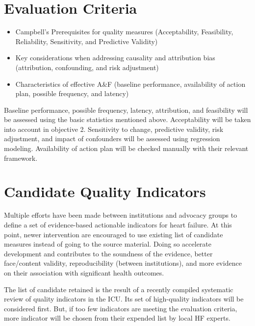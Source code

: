\section{Evaluation Criteria}
\begin{itemize}
    \item Campbell's Prerequisites for quality measures (Acceptability, Feasibility, Reliability, Sensitivity, and Predictive Validity) \cite{campbell2002research}
    \item Key considerations when addressing causality and attribution bias (attribution, confounding, and risk adjustment) \cite{terris2009attribution}
    \item Characteristics of effective A\&F (baseline performance, availability of action plan, possible frequency, and latency)\cite{ivers2012audit} %
\end{itemize}

Baseline performance, possible frequency, latency, attribution, and feasibility will be assessed using the basic statistics mentioned above. Acceptability will be taken into account in objective 2. Sensitivity to change, predictive validity, risk adjustment, and impact of confounders will be assessed using regression modeling. Availability of action plan will be checked manually with their relevant framework.

\section{Candidate Quality Indicators}
Multiple efforts have been made between institutions and advocacy groups to define a set of evidence-based actionable indicators for heart failure.\cite{hong2006overview}\cite{fonarow2010improving} \cite{kelley2006health} At this point, newer intervention are encouraged to use existing list of candidate measures instead of going to the source material. Doing so accelerate development and contributes to the soundness of the evidence, better face/content validity, reproducibility (between institutions), and more evidence on their association with significant health outcomes.\cite{smith2009performance}

The list of candidate retained is the result of a recently compiled systematic review of quality indicators in the ICU.\cite{goldfarb2018systematic} Its set of high-quality indicators will be considered first. But, if too few indicators are meeting the evaluation criteria, more indicator will be chosen from their expended list by local HF experts.

